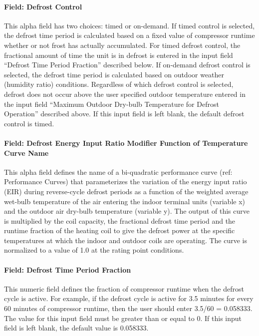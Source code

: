 \paragraph{Field: Defrost Control}

This alpha field has two choices: timed or on-demand. If timed control is selected, the defrost time period is calculated based on a fixed value of compressor runtime whether or not frost has actually accumulated. For timed defrost control, the fractional amount of time the unit is in defrost is entered in the input field ``Defrost Time Period Fraction'' described below. If on-demand defrost control is selected, the defrost time period is calculated based on outdoor weather (humidity ratio) conditions. Regardless of which defrost control is selected, defrost does not occur above the user specified outdoor temperature entered in the input field ``Maximum Outdoor Dry-bulb Temperature for Defrost Operation'' described above. If this input field is left blank, the default defrost control is timed.

\paragraph{Field: Defrost Energy Input Ratio Modifier Function of Temperature Curve Name}

This alpha field defines the name of a bi-quadratic performance curve (ref: Performance Curves) that parameterizes the variation of the energy input ratio (EIR) during reverse-cycle defrost periods as a function of the weighted average wet-bulb temperature of the air entering the indoor terminal units (variable x) and the outdoor air dry-bulb temperature (variable y). The output of this curve is multiplied by the coil capacity, the fractional defrost time period and the runtime fraction of the heating coil to give the defrost power at the specific temperatures at which the indoor and outdoor coils are operating. The curve is normalized to a value of 1.0 at the rating point conditions.

\paragraph{Field: Defrost Time Period Fraction}

This numeric field defines the fraction of compressor runtime when the defrost cycle is active. For example, if the defrost cycle is active for 3.5 minutes for every 60 minutes of compressor runtime, then the user should enter 3.5/60 = 0.058333. The value for this input field must be greater than or equal to 0. If this input field is left blank, the default value is 0.058333.

